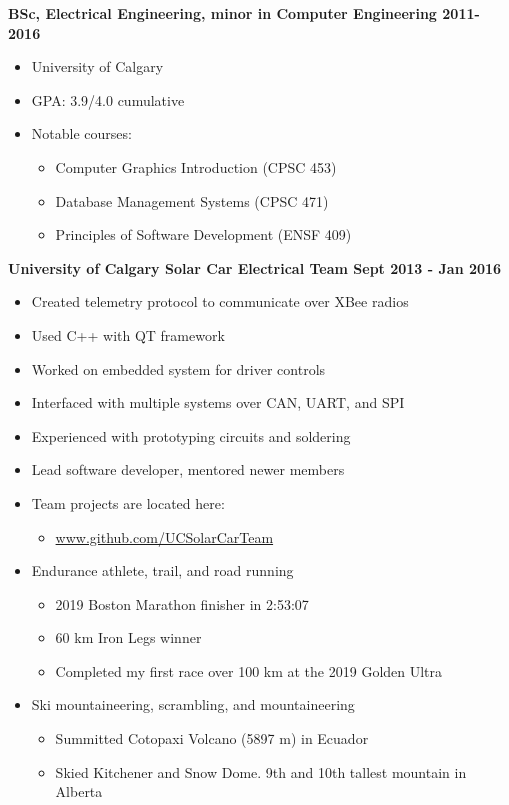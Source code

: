 \documentclass[12pt]{article}
\begin{document}
\bigskip
{}
\medskip

\noindent \centerline{ \bf BSc, Electrical Engineering, minor in Computer Engineering  \hfill 2011-2016}
\begin{itemize}[parsep=0pt,partopsep=0pt]
  \item University of Calgary
  \item GPA: 3.9/4.0 cumulative
  \item Notable courses:
  \begin{itemize}
    \item Computer Graphics Introduction (CPSC 453)
    \item Database Management Systems (CPSC 471)
    \item Principles of Software Development (ENSF 409)
  \end{itemize}
\end{itemize}

\bigskip
{}
\medskip

\noindent \centerline{\bf University of Calgary Solar Car Electrical Team \hfill Sept 2013 - Jan 2016}
\begin{itemize}
  \item Created telemetry protocol to communicate over XBee radios
  \item Used C++ with QT framework
  \item Worked on embedded system for driver controls
  \item Interfaced with multiple systems over CAN, UART, and SPI
  \item Experienced with prototyping circuits and soldering
  \item Lead software developer, mentored newer members
  \item Team projects are located here:
\begin{itemize}
  \item \url{www.github.com/UCSolarCarTeam}
\end{itemize}
\end{itemize}

\bigskip
{}
\medskip

\begin{itemize}
\item Endurance athlete, trail, and road running
  \begin{itemize}
    \item 2019 Boston Marathon finisher in 2:53:07
    \item 60 km Iron Legs winner
    \item Completed my first race over 100 km at the 2019 Golden Ultra
  \end{itemize}
\item Ski mountaineering, scrambling, and mountaineering
  \begin{itemize}
    \item Summitted Cotopaxi Volcano (5897 m) in Ecuador
    \item Skied Kitchener and Snow Dome. 9th and 10th tallest mountain in Alberta
  \end{itemize}
\end{itemize}
\end{document}
